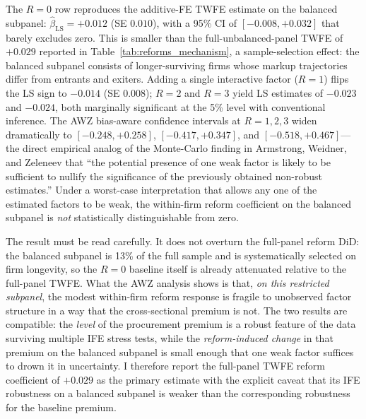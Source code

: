 \documentclass[11pt]{article}
\begin{document}


The $R = 0$ row reproduces the additive-FE TWFE estimate on the balanced subpanel: $\hat\beta_{\text{LS}} = +0.012$ (SE $0.010$), with a 95\% CI of $[-0.008, +0.032]$ that barely excludes zero. This is smaller than the full-unbalanced-panel TWFE of $+0.029$ reported in Table~\ref{tab:reforms_mechanism}, a sample-selection effect: the balanced subpanel consists of longer-surviving firms whose markup trajectories differ from entrants and exiters. Adding a single interactive factor ($R = 1$) flips the LS sign to $-0.014$ (SE $0.008$); $R = 2$ and $R = 3$ yield LS estimates of $-0.023$ and $-0.024$, both marginally significant at the 5\% level with conventional inference. The AWZ bias-aware confidence intervals at $R = 1, 2, 3$ widen dramatically to $[-0.248, +0.258]$, $[-0.417, +0.347]$, and $[-0.518, +0.467]$---the direct empirical analog of the Monte-Carlo finding in Armstrong, Weidner, and Zeleneev \cite{ArmstrongWeidnerZeleneev2024} that ``the potential presence of one weak factor is likely to be sufficient to nullify the significance of the previously obtained non-robust estimates.'' Under a worst-case interpretation that allows any one of the estimated factors to be weak, the within-firm reform coefficient on the balanced subpanel is \emph{not} statistically distinguishable from zero.

The result must be read carefully. It does not overturn the full-panel reform DiD: the balanced subpanel is 13\% of the full sample and is systematically selected on firm longevity, so the $R = 0$ baseline itself is already attenuated relative to the full-panel TWFE. What the AWZ analysis shows is that, \emph{on this restricted subpanel}, the modest within-firm reform response is fragile to unobserved factor structure in a way that the cross-sectional premium is not. The two results are compatible: the \emph{level} of the procurement premium is a robust feature of the data surviving multiple IFE stress tests, while the \emph{reform-induced change} in that premium on the balanced subpanel is small enough that one weak factor suffices to drown it in uncertainty. I therefore report the full-panel TWFE reform coefficient of $+0.029$ as the primary estimate with the explicit caveat that its IFE robustness on a balanced subpanel is weaker than the corresponding robustness for the baseline premium.
\end{document}
